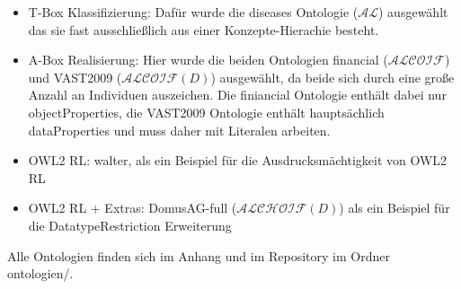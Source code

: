 \begin{itemize}
  \item T-Box Klassifizierung: Dafür wurde die diseases Ontologie ($\mathcal{AL}$) ausgewählt das sie fast ausschließlich aus einer Konzepte-Hierachie besteht.
  \item A-Box Realisierung: Hier wurde die beiden Ontologien financial ($\mathcal{ALCOIF}$) und VAST2009 ($\mathcal{ALCOIF}(D)$) ausgewählt, da beide sich durch eine große Anzahl an Individuen auszeichen. Die finiancial Ontologie enthält dabei nur objectProperties, die VAST2009 Ontologie enthält hauptsächlich dataProperties und muss daher mit Literalen arbeiten.
  \item OWL2 RL: walter, als ein Beispiel für die Ausdrucksmächtigkeit von OWL2 RL
  \item OWL2 RL + Extras: DomusAG-full ($\mathcal{ALCHOIF}(D)$) als ein Beispiel für die DatatypeRestriction Erweiterung
\end{itemize}

Alle Ontologien finden sich im Anhang und im Repository im Ordner ontologien/.
